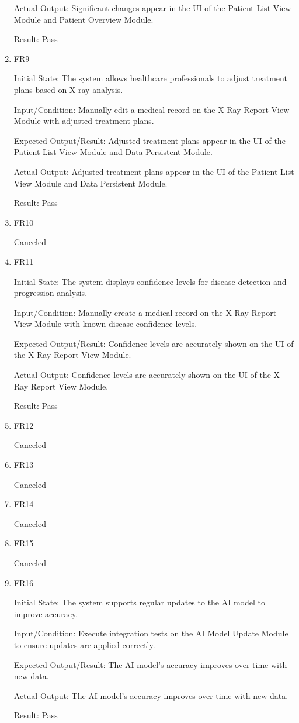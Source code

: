 \documentclass[12pt, titlepage]{article}
\begin{document}
\begin{enumerate}
Actual Output: Significant changes appear in the UI of the Patient List View Module and Patient Overview Module.

Result: Pass

\item{FR9}

Initial State: The system allows healthcare professionals to adjust treatment plans based on X-ray analysis.

Input/Condition: Manually edit a medical record on the X-Ray Report View Module with adjusted treatment plans.

Expected Output/Result: Adjusted treatment plans appear in the UI of the Patient List View Module and Data Persistent Module.

Actual Output: Adjusted treatment plans appear in the UI of the Patient List View Module and Data Persistent Module.

Result: Pass

\item{FR10}

Canceled

\item{FR11}

Initial State: The system displays confidence levels for disease detection and progression analysis.

Input/Condition: Manually create a medical record on the X-Ray Report View Module with known disease confidence levels.

Expected Output/Result: Confidence levels are accurately shown on the UI of the X-Ray Report View Module.

Actual Output: Confidence levels are accurately shown on the UI of the X-Ray Report View Module.

Result: Pass

\item{FR12}

Canceled

\item{FR13}

Canceled

\item{FR14}

Canceled

\item{FR15}

Canceled

\item{FR16}

Initial State: The system supports regular updates to the AI model to improve accuracy.

Input/Condition: Execute integration tests on the AI Model Update Module to ensure updates are applied correctly.

Expected Output/Result: The AI model’s accuracy improves over time with new data.

Actual Output: The AI model’s accuracy improves over time with new data.

Result: Pass

\end{enumerate}
\end{document}
